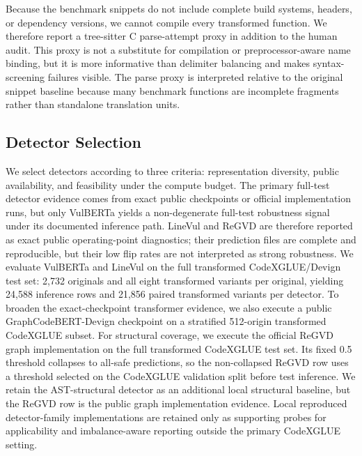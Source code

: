 \documentclass[a4paper,fleqn]{cas-dc}
\begin{document}
Because the benchmark snippets do not include complete build systems, headers,
or dependency versions, we cannot compile every transformed function. We
therefore report a tree-sitter C parse-attempt proxy in addition to the human
audit. This proxy is not a substitute for compilation or preprocessor-aware
name binding, but it is more informative than delimiter balancing and makes
syntax-screening failures visible. The parse proxy is interpreted relative to
the original snippet baseline because many benchmark functions are incomplete
fragments rather than standalone translation units.

\subsection{Detector Selection}

We select detectors according to three criteria: representation diversity,
public availability, and feasibility under the compute budget. The primary
full-test detector evidence comes from exact public checkpoints or official
implementation runs, but only VulBERTa yields a non-degenerate full-test
robustness signal under its documented inference path. LineVul and ReGVD are
therefore reported as exact public operating-point diagnostics; their
prediction files are complete and reproducible, but their low flip rates are
not interpreted as strong robustness. We evaluate VulBERTa
and LineVul on the full transformed CodeXGLUE/Devign test set: 2,732 originals
and all eight transformed variants per original, yielding 24,588 inference rows
and 21,856 paired transformed variants per detector. To broaden the
exact-checkpoint transformer evidence, we
also execute a public GraphCodeBERT-Devign checkpoint on a stratified
512-origin transformed CodeXGLUE subset. For structural coverage, we execute
the official ReGVD graph implementation on the full transformed CodeXGLUE test
set. Its fixed 0.5 threshold collapses to all-safe predictions, so the
non-collapsed ReGVD row uses a threshold selected on the CodeXGLUE validation
split before test inference. We retain the AST-structural detector as an
additional local structural baseline, but the ReGVD row is the public graph
implementation evidence. Local reproduced detector-family implementations are
retained only as supporting probes for applicability and imbalance-aware
reporting outside the primary CodeXGLUE setting.
\end{document}
